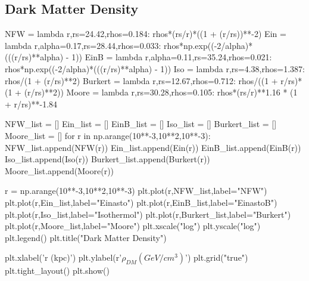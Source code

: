 \documentclass[10pt, oneside]{book}
\numberwithin{equation}{chapter}
\begin{document}
\subsection{Dark Matter Density}
\begin{python}
NFW = lambda r,rs=24.42,rhos=0.184: rhos*(rs/r)*((1 + (r/rs))**-2)
Ein = lambda r,alpha=0.17,rs=28.44,rhos=0.033: rhos*np.exp((-2/alpha)*(((r/rs)**alpha) - 1))
EinB = lambda r,alpha=0.11,rs=35.24,rhos=0.021: rhos*np.exp((-2/alpha)*(((r/rs)**alpha) - 1))
Iso = lambda r,rs=4.38,rhos=1.387: rhos/(1 + (r/rs)**2)
Burkert = lambda r,rs=12.67,rhos=0.712: rhos/((1 + r/rs)*(1 + (r/rs)**2))
Moore = lambda r,rs=30.28,rhos=0.105: rhos*(rs/r)**1.16 * (1 + r/rs)**-1.84

NFW_list = []
Ein_list = []
EinB_list = []
Iso_list = []
Burkert_list = []
Moore_list = []
for r in np.arange(10**-3,10**2,10**-3):
  NFW_list.append(NFW(r))
  Ein_list.append(Ein(r))
  EinB_list.append(EinB(r))
  Iso_list.append(Iso(r))
  Burkert_list.append(Burkert(r))
  Moore_list.append(Moore(r))

r = np.arange(10**-3,10**2,10**-3)
plt.plot(r,NFW_list,label="NFW")
plt.plot(r,Ein_list,label="Einasto")
plt.plot(r,EinB_list,label="EinastoB")
plt.plot(r,Iso_list,label="Isothermol")
plt.plot(r,Burkert_list,label="Burkert")
plt.plot(r,Moore_list,label="Moore")
plt.xscale("log")
plt.yscale("log")
plt.legend()
plt.title("Dark Matter Density")

plt.xlabel('r (kpc)')
plt.ylabel(r'$\rho_{DM} (GeV/cm^3)$')
plt.grid("true")
plt.tight_layout()
plt.show()
\end{python}
\end{document}
